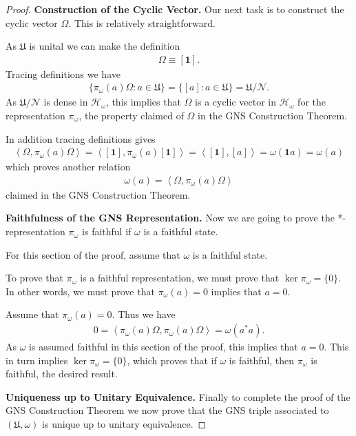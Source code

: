 \begin{proof}
\noindent\textbf{Construction of the Cyclic Vector.}
Our next task is to construct the cyclic vector $\Omega$. This is relatively straightforward.

As $\mathfrak{U}$ is unital we can make the definition
\begin{align}
    \Omega \equiv [\mathbf{1}].
\end{align}
Tracing definitions we have
\begin{align}
    \{\pi_\omega(a)\Omega : a \in \mathfrak{U}\} = \{[a] : a \in \mathfrak{U}\} = \mathfrak{U} / \mathcal{N}.
\end{align}
As $\mathfrak{U} / \mathcal{N}$ is dense in $\mathcal{H}_\omega$, this implies that $\Omega$ is a cyclic vector in $\mathcal{H}_\omega$ for the representation $\pi_\omega$, the property claimed of $\Omega$ in the GNS Construction Theorem.

In addition tracing definitions gives
\begin{align}
    \left<\Omega, \pi_\omega(a)\Omega\right> = \left<[\mathbf{1}], \pi_\omega(a)[\mathbf{1}]\right> = \left<[\mathbf{1}], [a]\right> = \omega(\mathbf{1}a) = \omega(a)
\end{align}
which proves another relation
\begin{align}
    \omega(a) = \left<\Omega, \pi_\omega(a)\Omega\right>
\end{align}
claimed in the GNS Construction Theorem.

\noindent\textbf{Faithfulness of the GNS Representation.}
Now we are going to prove the *-representation $\pi_\omega$ is faithful if $\omega$ is a faithful state.

For this section of the proof, assume that $\omega$ is a faithful state.

To prove that $\pi_\omega$ is a faithful representation, we must prove that $\ker \pi_\omega = \{0\}$. In other words, we must prove that $\pi_\omega(a) = 0$ implies that $a=0$.

Assume that $\pi_\omega(a) = 0$. Thus we have
\begin{align}
    0 = \left<\pi_\omega(a)\Omega, \pi_\omega(a)\Omega\right> = \omega(a^*a).
\end{align}
As $\omega$ is assumed faithful in this section of the proof, this implies that $a=0$. This in turn implies $\ker \pi_\omega = \{0\}$, which proves that if $\omega$ is faithful, then $\pi_\omega$ is faithful, the desired result.

\noindent\textbf{Uniqueness up to Unitary Equivalence.}
Finally to complete the proof of the GNS Construction Theorem we now prove that the GNS triple associated to $(\mathfrak{U}, \omega)$ is unique up to unitary equivalence.


\end{proof}
